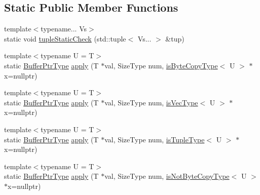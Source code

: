 \subsection*{Static Public Member Functions}
\begin{DoxyCompactItemize}
\item 
{\footnotesize template$<$typename... Vs$>$ }\\static void \hyperlink{structvt_1_1serialization_1_1_byte_copyable_traits_aaad683f9cdcd56e768a19864c22d1020}{tuple\+Static\+Check} (std\+::tuple$<$ Vs... $>$ \&tup)
\item 
{\footnotesize template$<$typename U  = T$>$ }\\static \hyperlink{structvt_1_1serialization_1_1_byte_copyable_traits_ab06bcaa790f4a227936f6d6854d2bf41}{Buffer\+Ptr\+Type} \hyperlink{structvt_1_1serialization_1_1_byte_copyable_traits_acff1719ea2b2291b4ef73f03a6edc9c4}{apply} (T $\ast$val, Size\+Type num, \hyperlink{structvt_1_1serialization_1_1_byte_copyable_traits_a3113636143fcf9ee209752353f9fec3a}{is\+Byte\+Copy\+Type}$<$ U $>$ $\ast$x=nullptr)
\item 
{\footnotesize template$<$typename U  = T$>$ }\\static \hyperlink{structvt_1_1serialization_1_1_byte_copyable_traits_ab06bcaa790f4a227936f6d6854d2bf41}{Buffer\+Ptr\+Type} \hyperlink{structvt_1_1serialization_1_1_byte_copyable_traits_ad7f6f30f399a7021bb6e3895e955b503}{apply} (T $\ast$val, Size\+Type num, \hyperlink{structvt_1_1serialization_1_1_byte_copyable_traits_a99c4b667bd99e2cdaad0e0be5b21af50}{is\+Vec\+Type}$<$ U $>$ $\ast$x=nullptr)
\item 
{\footnotesize template$<$typename U  = T$>$ }\\static \hyperlink{structvt_1_1serialization_1_1_byte_copyable_traits_ab06bcaa790f4a227936f6d6854d2bf41}{Buffer\+Ptr\+Type} \hyperlink{structvt_1_1serialization_1_1_byte_copyable_traits_a05047eccf3aa8afadaac31783cd74b86}{apply} (T $\ast$val, Size\+Type num, \hyperlink{structvt_1_1serialization_1_1_byte_copyable_traits_ac6700c34f3c9642a029d3d3857811f59}{is\+Tuple\+Type}$<$ U $>$ $\ast$x=nullptr)
\item 
{\footnotesize template$<$typename U  = T$>$ }\\static \hyperlink{structvt_1_1serialization_1_1_byte_copyable_traits_ab06bcaa790f4a227936f6d6854d2bf41}{Buffer\+Ptr\+Type} \hyperlink{structvt_1_1serialization_1_1_byte_copyable_traits_a7f61ed0ebf3f22db6f9aa8d4e3dd28ca}{apply} (T $\ast$val, Size\+Type num, \hyperlink{structvt_1_1serialization_1_1_byte_copyable_traits_a9cbf2126e3b503513822b5f4f3dfa136}{is\+Not\+Byte\+Copy\+Type}$<$ U $>$ $\ast$x=nullptr)
\end{DoxyCompactItemize}


